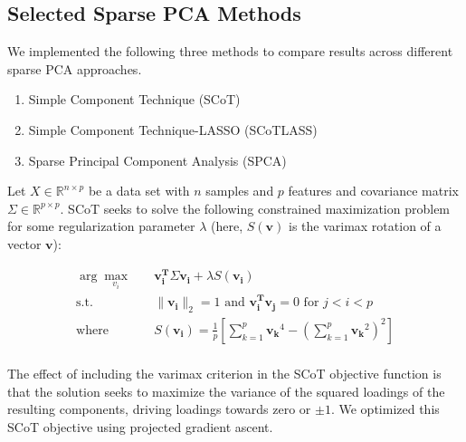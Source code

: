 \documentclass[12pt,letterpaper]{report}
\begin{document}

\subsection*{Selected Sparse PCA Methods}

We implemented the following three methods to compare results across different sparse PCA approaches.\\
\begin{enumerate}[nolistsep]\\
    \item Simple Component Technique (SCoT)
    \item Simple Component Technique-LASSO (SCoTLASS)
    \item Sparse Principal Component Analysis (SPCA)\\
\end{enumerate}

Let $X \in \mathbb{R}^{n\times p}$ be a data set with $n$ samples and $p$ features and covariance matrix $\Sigma \in \mathbb{R}^{p\times p}$. SCoT seeks to solve the following constrained maximization problem for some regularization parameter $\lambda$ (here, $S(\mathbf{v})$ is the varimax rotation of a vector $\mathbf{v}$):

\begin{equation}
\begin{aligned}
\arg\max_{v_{i}} \quad & \mathbf{v_{i}^{T}}\Sigma \mathbf{v_{i}} + \lambda S(\mathbf{v_{i}})\\
\textrm{s.t.} \quad & \lVert \mathbf{v_{i}} \rVert_{2} = 1 \text{ and } \mathbf{v_{i}^{T}}\mathbf{v_{j}} = 0 \text{ for } j < i < p \\
\textrm{where} \quad & S(\mathbf{v_{i}}) = \frac{1}{p}\left[\sum_{k=1}^{p} \mathbf{v_{k}}^4- (\sum_{k=1}^{p} \mathbf{v_{k}}^2)^2 \right]\\ 
\end{aligned}
\end{equation}

The effect of including the varimax criterion in the SCoT objective function is that the solution seeks to maximize the variance of the squared loadings of the resulting components, driving loadings towards zero or $\pm{1}$. We optimized this SCoT objective using projected gradient ascent.\\
\end{document}
